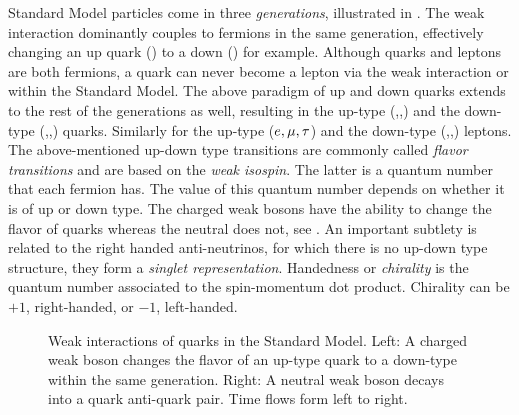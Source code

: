 Standard Model particles come in three {\it generations}, illustrated in .
The weak interaction dominantly couples to fermions in the same generation, effectively changing an up quark (\uquark) to a down (\dquark) for example.
Although quarks and leptons are both fermions, a quark can never become a lepton via the weak interaction or \viceversa within the Standard Model.
The above paradigm of up and down quarks extends to the rest of the generations as well, resulting in the up-type (\uquark,\cquark,\tquark)
and the down-type (\dquark,\squark,\bquark) quarks. Similarly for the  up-type ($e,\mu,\tau$) and the down-type (\neue,\neum,\neut)
leptons. The above-mentioned up-down type transitions are commonly called {\it flavor transitions} and are based on the
{\it weak isospin}. The latter is a quantum number that each fermion has. The value of this quantum number depends on whether it is of up or down type.
The charged weak bosons \Wpm have the ability to change the flavor of quarks whereas the neutral \Z does not, see .
An important subtlety is related to the right handed anti-neutrinos, for which there is no up-down type structure,
\ie they form a  {\it singlet representation}. Handedness or {\it chirality} is the quantum number associated to the
spin-momentum dot product. Chirality can be $+1$, right-handed, or $-1$, left-handed.

\begin{figure}[t]
  \centering
  \begin{subfigure}{0.49\textwidth}
    \hspace{1.3cm}
    \scalebox{1.}{}
    \caption{}
    \label{CC_WeakInteractions}
  \end{subfigure}%
  \hfill%
  \begin{subfigure}{0.49\textwidth}
    \hspace{1.3cm}
    \scalebox{1.}{}
    \caption{}
    \label{NC_WeakInteractions}
  \end{subfigure}
  \caption{Weak interactions of quarks in the Standard Model. Left: A charged weak boson changes the flavor
           of an up-type quark to a down-type within the same generation.
           Right: A neutral weak boson decays into a quark anti-quark pair. Time flows form left to right.}
\label{WeakInteractions}
\end{figure}

